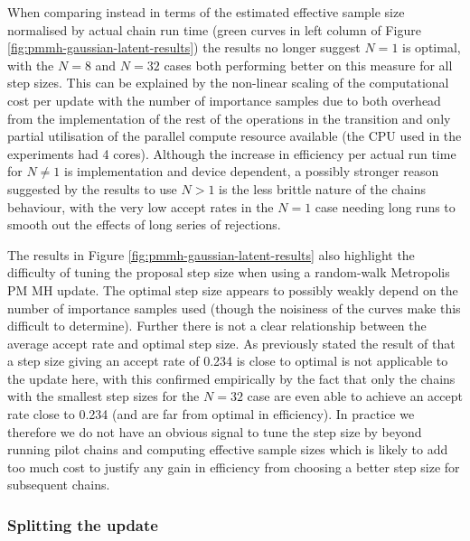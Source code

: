 When comparing instead in terms of the estimated effective sample size normalised by actual chain run time (green curves in left column of Figure \ref{fig:pmmh-gaussian-latent-results}) the results no longer suggest $N=1$ is optimal, with the $N=8$ and $N=32$ cases both performing better on this measure for all step sizes. This can be explained by the non-linear scaling of the computational cost per update with the number of importance samples due to both overhead from the implementation of the rest of the operations in the transition and only partial utilisation of the parallel compute resource available (the \ac{CPU} used in the experiments had 4 cores). Although the increase in efficiency per actual run time for $N\neq 1$ is implementation and device dependent, a possibly stronger reason suggested by the results to use $N > 1$ is the less brittle nature of the chains behaviour, with the very low accept rates in the $N=1$ case needing long runs to smooth out the effects of long series of rejections.

The results in Figure \ref{fig:pmmh-gaussian-latent-results} also highlight the difficulty of tuning the proposal step size when using a random-walk Metropolis \ac{PM} \ac{MH} update. The optimal step size appears to possibly weakly depend on the number of importance samples used (though the noisiness of the curves make this difficult to determine). Further there is not a clear relationship between the average accept rate and optimal step size. As previously stated the result of \citep{gelman1997weak} that a step size giving an accept rate of 0.234 is close to optimal is not applicable to the update here, with this confirmed empirically by the fact that only the chains with the smallest step sizes for the $N=32$ case are even able to achieve an accept rate close to 0.234 (and are far from optimal in efficiency). In practice we therefore we do not have an obvious signal to tune the step size by beyond running pilot chains and computing effective sample sizes which is likely to add too much cost to justify any gain in efficiency from choosing a better step size for subsequent chains.

\subsubsection{Splitting the update}

